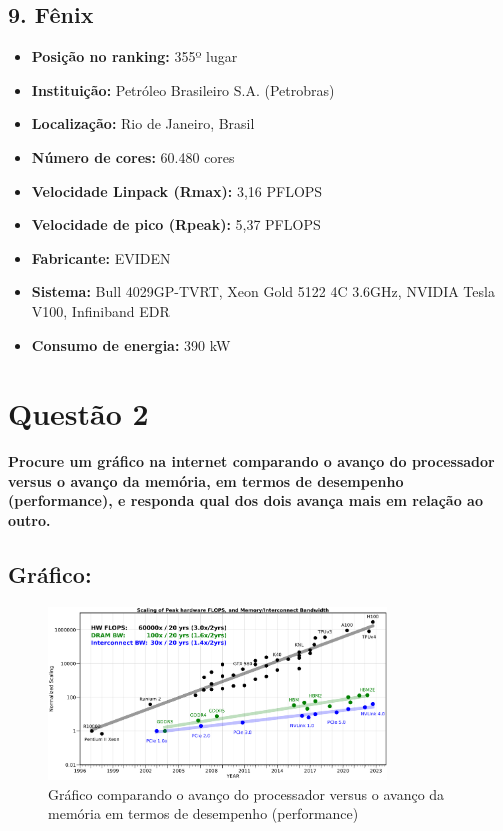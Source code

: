 \documentclass[12pt,a4paper]{article}
\begin{document}
\subsection*{9. Fênix}
\begin{itemize}
    \item \textbf{Posição no ranking:} 355º lugar
    \item \textbf{Instituição:} Petróleo Brasileiro S.A. (Petrobras)
    \item \textbf{Localização:} Rio de Janeiro, Brasil
    \item \textbf{Número de cores:} 60.480 cores
    \item \textbf{Velocidade Linpack (Rmax):} 3,16 PFLOPS
    \item \textbf{Velocidade de pico (Rpeak):} 5,37 PFLOPS
    \item \textbf{Fabricante:} EVIDEN
    \item \textbf{Sistema:} Bull 4029GP-TVRT, Xeon Gold 5122 4C 3.6GHz, NVIDIA Tesla V100, Infiniband EDR
    \item \textbf{Consumo de energia:} 390 kW
\end{itemize}

\newpage
\section*{Questão 2}

\textbf{Procure um gráfico na internet comparando o avanço do processador versus o avanço da memória, em termos de desempenho (performance), e responda qual dos dois avança mais em relação ao outro.}

\subsection*{Gráfico:}

\begin{figure}[h]
    \centering
    \includegraphics[width=0.8\textwidth]{image.png}
    \caption{Gráfico comparando o avanço do processador versus o avanço da memória em termos de desempenho (performance)}
    \label{fig:memory_wall}
\end{figure}
\end{document}
